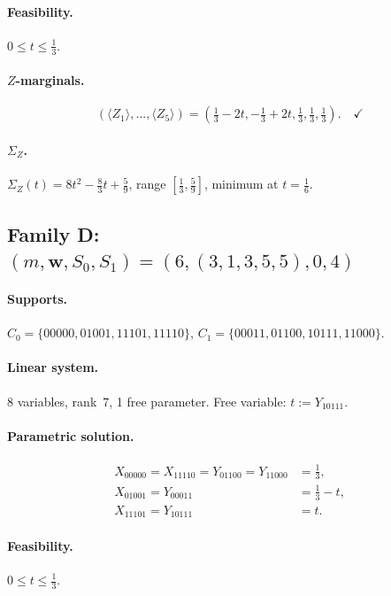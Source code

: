 \documentclass{article}
\newcommand{\SigZ}{\Sigma_Z}
\begin{document}
\paragraph{Feasibility.} $0\le t\le \frac{1}{3}$. \checkmark

\paragraph{$Z$-marginals.}
\[
(\langle Z_1\rangle,\dots,\langle Z_5\rangle)
= (\tfrac13-2t, {-}\tfrac13+2t, \tfrac13, \tfrac13, \tfrac13). \quad\checkmark
\]

\paragraph{$\SigZ$.}
$\SigZ(t)=8t^2-\frac{8}{3}t+\frac{5}{9}$, range $[\tfrac13,\tfrac59]$, minimum at $t=\tfrac16$. \checkmark

\subsection{Family D: $(m,\mathbf{w},S_0,S_1)=(6,(3,1,3,5,5),0,4)$}

\paragraph{Supports.}
$C_0=\{00000, 01001, 11101, 11110\}$,\quad
$C_1=\{00011, 01100, 10111, 11000\}$.

\paragraph{Linear system.}
8 variables, rank~7, 1 free parameter.
Free variable: $t:=Y_{10111}$.

\paragraph{Parametric solution.}
\[
\begin{aligned}
X_{00000}=X_{11110}=Y_{01100}=Y_{11000} &= \tfrac{1}{3},\\
X_{01001}=Y_{00011} &= \tfrac{1}{3}-t,\\
X_{11101}=Y_{10111} &= t.
\end{aligned}
\]

\paragraph{Feasibility.} $0\le t\le \frac{1}{3}$. \checkmark
\end{document}
